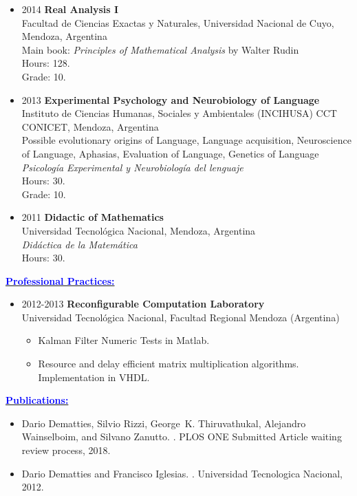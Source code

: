 \documentclass{article}
\newcommand{\statement}[1]{\par\medskip
  \underline{\textcolor{blue}{\textbf{#1:}}}\space
}
\begin{document}
\begin{itemize}
	\item 2014 {\bf Real Analysis I}\\
Facultad de Ciencias Exactas y Naturales, Universidad Nacional de Cuyo, Mendoza, Argentina\\
Main book: {\it Principles of Mathematical Analysis} by Walter Rudin\\
Hours: 128.\\
Grade: 10.
\pagebreak
	\item 2013 {\bf Experimental Psychology and Neurobiology of Language}\\
Instituto de Ciencias Humanas, Sociales y Ambientales (INCIHUSA) CCT CONICET, Mendoza, Argentina\\
Possible evolutionary origins of Language, Language acquisition, Neuroscience of Language, Aphasias, Evaluation of Language, Genetics of Language\\ 
{\it Psicolog\'ia Experimental y Neurobiolog\'ia del lenguaje}\\
Hours: 30.\\
Grade: 10.

	\item 2011 {\bf Didactic of Mathematics}\\
Universidad Tecnol\'ogica Nacional, Mendoza, Argentina\\
{\it Did\'actica de la Matem\'atica}\\
Hours: 30.

\end{itemize}
 









\statement{Professional Practices}
\begin{itemize}
	\item 2012-2013 {\bf Reconfigurable Computation Laboratory}\\
Universidad Tecnol\'ogica Nacional, Facultad Regional Mendoza (Argentina)
\begin{itemize}
	\item Kalman Filter Numeric Tests in Matlab.
	\item Resource and delay efficient matrix multiplication algorithms. Implementation in VHDL.
\end{itemize}
\end{itemize}

 




\statement{Publications}
\begin{itemize}
	\item Dario Dematties, Silvio Rizzi, George~K. Thiruvathukal, Alejandro Wainselboim,
  and Silvano Zanutto.
.
\newblock PLOS ONE Submitted Article waiting review process, 2018.
	\item Dario Dematties and Francisco Iglesias.
.
\newblock Universidad Tecnologica Nacional, 2012.
\end{itemize}
\end{document}
